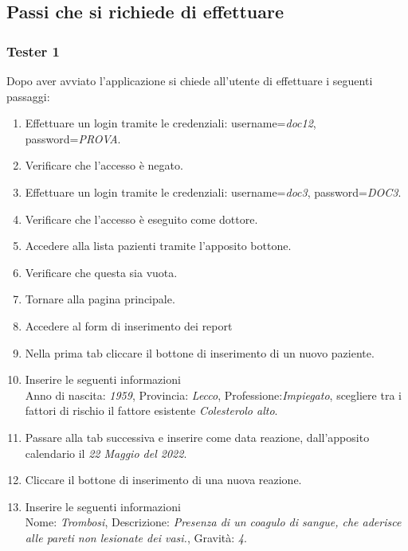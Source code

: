 \documentclass[11pt]{article}
\begin{document}
        \subsection*{Passi che si richiede di effettuare}

            \subsubsection*{Tester 1}
            Dopo aver avviato l'applicazione si chiede all'utente di effettuare i seguenti passaggi:
            \begin{enumerate}
                \item Effettuare un login tramite le credenziali: username=\textit{doc12}, password=\textit{PROVA}.
                \item Verificare che l'accesso è negato.
                \item Effettuare un login tramite le credenziali: username=\textit{doc3}, password=\textit{DOC3}.
                \item Verificare che l'accesso è eseguito come dottore.
                \item Accedere alla lista pazienti tramite l'apposito bottone.
                \item Verificare che questa sia vuota.
                \item Tornare alla pagina principale.
                \item Accedere al form di inserimento dei report
                \item Nella prima tab cliccare il bottone di inserimento di un nuovo paziente.
                \item Inserire le seguenti informazioni\\
                        Anno di nascita: \textit{1959}, Provincia: \textit{Lecco}, Professione:\textit{Impiegato}, scegliere tra i fattori di rischio il fattore esistente \textit{Colesterolo alto}.
                \item Passare alla tab successiva e inserire come data reazione, dall'apposito calendario il \textit{22 Maggio del 2022}.
                \item Cliccare il bottone di inserimento di una nuova reazione.
                \item Inserire le seguenti informazioni\\ 
                        Nome: \textit{Trombosi}, Descrizione: \textit{Presenza di un coagulo di sangue, che aderisce alle pareti non lesionate dei vasi.}, Gravità: \textit{4}.

\end{enumerate}
\end{document}
